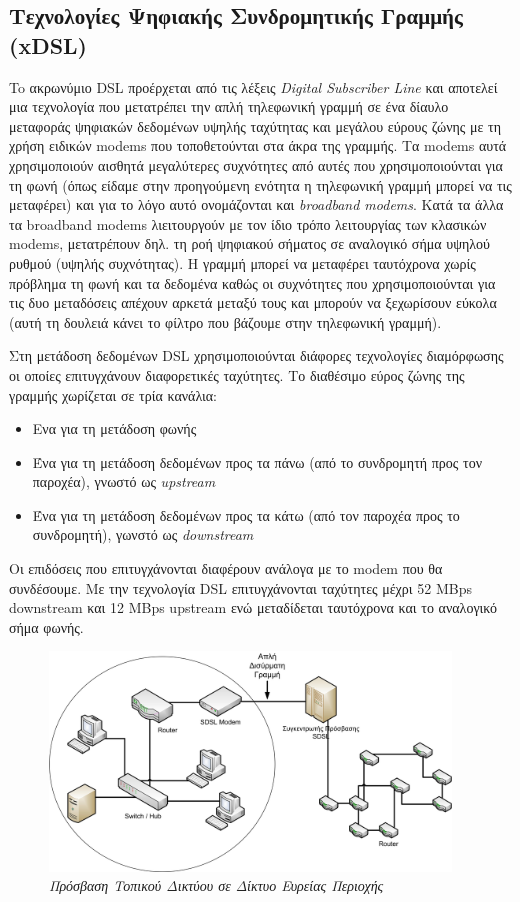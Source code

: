 %
%
\setcounter{subsection}{3}
\subsection{Τεχνολογίες Ψηφιακής Συνδρομητικής Γραμμής (xDSL)}

To ακρωνύμιο DSL προέρχεται από τις λέξεις \emph{Digital Subscriber Line} και αποτελεί μια τεχνολογία που μετατρέπει την απλή τηλεφωνική γραμμή σε ένα δίαυλο μεταφοράς ψηφιακών δεδομένων υψηλής ταχύτητας και μεγάλου εύρους ζώνης με τη χρήση ειδικών modems που τοποθετούνται στα άκρα της γραμμής. Τα modems αυτά χρησιμοποιούν αισθητά μεγαλύτερες συχνότητες από αυτές που χρησιμοποιούνται για τη φωνή (όπως είδαμε στην προηγούμενη ενότητα  η τηλεφωνική γραμμή μπορεί να τις μεταφέρει) και για το λόγο αυτό ονομάζονται και \emph{broadband modems}. Κατά τα άλλα τα broadband modems  λιειτουργούν με τον ίδιο τρόπο λειτουργίας των κλασικών modems, μετατρέπουν δηλ. τη ροή ψηφιακού σήματος  σε αναλογικό σήμα υψηλού ρυθμού (υψηλής συχνότητας). Η γραμμή μπορεί να μεταφέρει ταυτόχρονα χωρίς πρόβλημα τη φωνή και τα δεδομένα καθώς οι συχνότητες που χρησιμοποιούνται για τις δυο μεταδόσεις απέχουν αρκετά μεταξύ τους και μπορούν να ξεχωρίσουν εύκολα (αυτή τη δουλειά κάνει το φίλτρο που βάζουμε στην τηλεφωνική γραμμή).

Στη μετάδοση δεδομένων DSL χρησιμοποιούνται διάφορες τεχνολογίες διαμόρφωσης οι οποίες επιτυγχάνουν διαφορετικές ταχύτητες. Το διαθέσιμο εύρος ζώνης της γραμμής χωρίζεται σε τρία κανάλια:

\begin{itemize}
\item Ενα για τη μετάδοση φωνής
\item Ένα για τη μετάδοση δεδομένων προς τα πάνω (από το συνδρομητή προς τον παροχέα), γνωστό ως \emph{upstream}
\item Ένα για τη μετάδοση δεδομένων προς τα κάτω (από τον παροχέα προς το συνδρομητή), γωνστό ως \emph{downstream}
\end{itemize}

Οι επιδόσεις που επιτυγχάνονται διαφέρουν ανάλογα με το modem που θα συνδέσουμε. Με την τεχνολογία DSL επιτυγχάνονται ταχύτητες μέχρι 52 MBps downstream και 12 MBps upstream ενώ  μεταδίδεται ταυτόχρονα και το αναλογικό σήμα φωνής.

\begin{figure}[!ht]
  \centering
  \includegraphics[width=0.95\textwidth]{images/chapter5/5-2}
  \caption {\textsl{Πρόσβαση Τοπικού Δικτύου σε Δίκτυο Ευρείας Περιοχής}}
  \label{5-2}
\end{figure}

